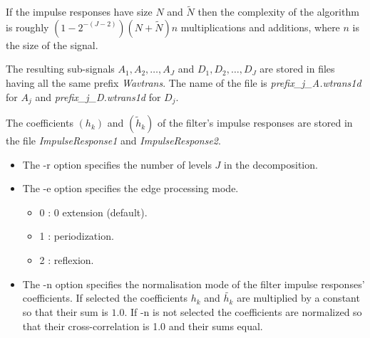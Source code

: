 If the impulse responses have size $N$ and $\tilde{N}$ then the complexity of the algorithm is roughly $(1 - 2^{-(J-2)})(N+\tilde{N})n$ multiplications and additions, where $n$ is the size of the signal. 

The resulting sub-signals \( A_{1}, A_{2}, \ldots, A_{J} \) and \( D_{1}, D_{2}, \ldots, D_{J} \) are stored in files having all the same prefix {\em Wavtrans}. The name of the file is {\em prefix\_j\_A.wtrans1d} for \( A_{j} \) and {\em prefix\_j\_D.wtrans1d} for \( D_{j} \).

The coefficients $(h_{k})$ and $(\tilde{h}_{k})$ of the filter's impulse responses are stored in the file {\em ImpulseResponse1} and {\em ImpulseResponse2}.

\begin{itemize}
\item
The -r option specifies the number of levels $J$ in the decomposition.
\item
The -e option specifies the edge processing mode.
\begin{itemize}
\item
0 : 0 extension (default).
\item
1 : periodization.
\item
2 : reflexion.
\end{itemize}
\item
The -n option specifies the normalisation mode of the filter impulse responses' coefficients. If selected the coefficients $h_{k}$ and $\tilde{h_{k}}$ are multiplied by a constant so that their sum is $1.0$. If -n is not selected the coefficients are normalized so that their cross-correlation is 1.0 and their sums equal. 
\end{itemize}


